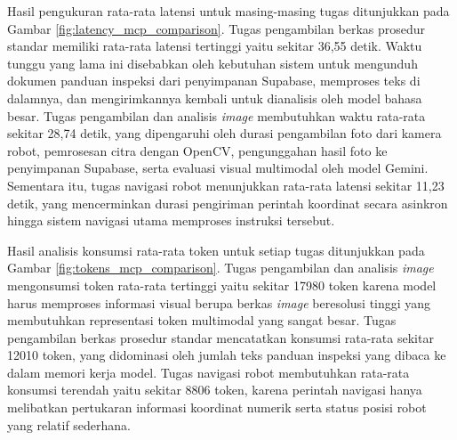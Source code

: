 Hasil pengukuran rata-rata latensi untuk masing-masing tugas ditunjukkan pada Gambar \ref{fig:latency_mcp_comparison}. Tugas pengambilan berkas prosedur standar memiliki rata-rata latensi tertinggi yaitu sekitar 36,55 detik. Waktu tunggu yang lama ini disebabkan oleh kebutuhan sistem untuk mengunduh dokumen panduan inspeksi dari penyimpanan Supabase, memproses teks di dalamnya, dan mengirimkannya kembali untuk dianalisis oleh model bahasa besar. Tugas pengambilan dan analisis \textit{image} membutuhkan waktu rata-rata sekitar 28,74 detik, yang dipengaruhi oleh durasi pengambilan foto dari kamera robot, pemrosesan citra dengan OpenCV, pengunggahan hasil foto ke penyimpanan Supabase, serta evaluasi visual multimodal oleh model Gemini. Sementara itu, tugas navigasi robot menunjukkan rata-rata latensi sekitar 11,23 detik, yang mencerminkan durasi pengiriman perintah koordinat secara asinkron hingga sistem navigasi utama memproses instruksi tersebut.

Hasil analisis konsumsi rata-rata token untuk setiap tugas ditunjukkan pada Gambar \ref{fig:tokens_mcp_comparison}. Tugas pengambilan dan analisis \textit{image} mengonsumsi token rata-rata tertinggi yaitu sekitar 17980 token karena model harus memproses informasi visual berupa berkas \textit{image} beresolusi tinggi yang membutuhkan representasi token multimodal yang sangat besar. Tugas pengambilan berkas prosedur standar mencatatkan konsumsi rata-rata sekitar 12010 token, yang didominasi oleh jumlah teks panduan inspeksi yang dibaca ke dalam memori kerja model. Tugas navigasi robot membutuhkan rata-rata konsumsi terendah yaitu sekitar 8806 token, karena perintah navigasi hanya melibatkan pertukaran informasi koordinat numerik serta status posisi robot yang relatif sederhana.
